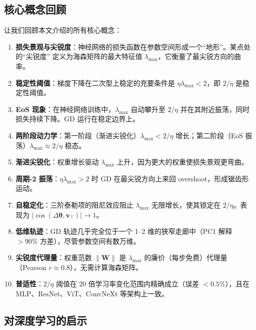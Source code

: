 \documentclass[11pt,a4paper]{ctexart}
\newcommand{\lmax}{\lambda_{\max}}
\newcommand{\vtopv}{\mathbf{v}_{\!\top}}
\newcommand{\dtheta}{\Delta\boldsymbol{\theta}}
\newcommand{\Wmat}{\mathbf{W}}
\begin{document}
\subsection{核心概念回顾}

让我们回顾本文介绍的所有核心概念：

\begin{enumerate}[leftmargin=2em]
  \item \textbf{损失景观与尖锐度}：神经网络的损失函数在参数空间形成一个``地形''。某点处的``尖锐度'' 定义为海森矩阵的最大特征值 $\lmax$，它衡量了最尖锐方向的曲率。

  \item \textbf{稳定性阈值}：梯度下降在二次型上稳定的充要条件是 $\eta\lmax < 2$，即 $2/\eta$ 是稳定性阈值。

  \item \textbf{EoS 现象}：在神经网络训练中，$\lmax$ 自动攀升至 $2/\eta$ 并在其附近振荡，同时损失持续下降。GD 运行在稳定边界上。

  \item \textbf{两阶段动力学}：第一阶段（渐进尖锐化）$\lmax < 2/\eta$ 增长；第二阶段（EoS 振荡）$\lmax \approx 2/\eta$ 稳态。

  \item \textbf{渐进尖锐化}：权重增长驱动 $\lmax$ 上升，因为更大的权重使损失景观更弯曲。

  \item \textbf{周期-2 振荡}：$\eta\lmax > 2$ 时 GD 在最尖锐方向上来回 overshoot，形成锯齿形运动。

  \item \textbf{自稳定化}：三阶泰勒项的阻尼效应阻止 $\lmax$ 无限增长，使其锁定在 $2/\eta$。表现为 $|\cos(\dtheta, \vtopv)| \to 1$。

  \item \textbf{低维轨迹}：GD 轨迹几乎完全位于一个 1--2 维的狭窄走廊中（PC1 解释 $>90\%$ 方差），尽管参数空间有数万维。

  \item \textbf{尖锐度代理量}：权重范数 $\|\Wmat\|$ 是 $\lmax$ 的廉价（每步免费）代理量（Pearson $r \approx 0.8$），无需计算海森矩阵。

  \item \textbf{普适性}：$2/\eta$ 阈值在 20 倍学习率变化范围内精确成立（误差 $<0.5\%$），且在 MLP、ResNet、ViT、ConvNeXt 等架构上一致。
\end{enumerate}

\subsection{对深度学习的启示}
\end{document}
